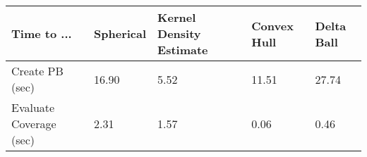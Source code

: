 \begin{table}[ht!]
\centering
\begin{tabular}{R{2in}L{.75in}L{1.1in}L{.9in}L{.75in}}
  \hline
\hline
Time to ... & Spherical & Kernel Density Estimate & Convex Hull & Delta Ball \\ 
  \hline
Create PB (sec) & 16.90 &  5.52 & 11.51 & 27.74 \\ 
  Evaluate Coverage (sec) & 2.31 & 1.57 & 0.06 & 0.46 \\ 
   \hline
\end{tabular}
\caption{} 
\label{tab:comp_time_summary}
\end{table}
